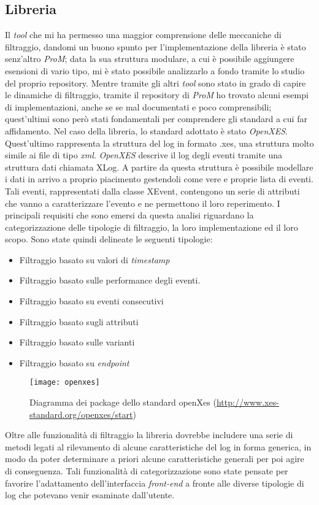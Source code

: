 \subsection{Libreria}
 Il \textit{tool} che mi ha permesso una maggior comprensione delle meccaniche di filtraggio, dandomi un buono spunto per l'implementazione della libreria è stato senz'altro \textit{ProM}; data la sua struttura modulare, a cui è possibile aggiungere esensioni di vario tipo, mi è stato possibile analizzarlo a fondo tramite lo studio del proprio repository. Mentre tramite gli altri \textit{tool} sono stato in grado di capire le dinamiche di filtraggio, tramite il repository di \textit{ProM} ho trovato alcuni esempi di implementazioni, anche se se mal documentati e poco comprensibili; quest'ultimi sono però stati fondamentali per comprendere gli standard a cui far affidamento. Nel caso della libreria, lo standard adottato è stato \textit{OpenXES}. Quest'ultimo rappresenta la struttura del log in formato .xes, una struttura molto simile ai file di tipo \textit{xml}. \textit{OpenXES} descrive il log degli eventi tramite una struttura dati chiamata XLog. A partire da questa struttura è possibile modellare i dati in arrivo a proprio piacimento gestendoli come vere e proprie lista di eventi. Tali eventi, rappresentati dalla classe XEvent, contengono un serie di attributi che vanno a caratterizzare l'evento e ne permettono il loro reperimento. I principali requisiti che sono emersi da questa analisi riguardano la categorizzazione delle tipologie di filtraggio, la loro implementazione ed il loro scopo. Sono state quindi delineate le seguenti tipologie:
\begin{itemize}
	\item Filtraggio basato su valori di \textit{timestamp}
	\item Filtraggio basato sulle performance degli eventi.
	\item Filtraggio basato su eventi consecutivi
	\item Filtraggio basato sugli attributi
	\item Filtraggio basato sulle varianti
	\item Filtraggio basato su \textit{endpoint}
\end{itemize}
\begin{figure}[!h] 
	\centering 
	\texttt{[image: openxes]} 
	\caption{Diagramma dei package dello standard openXes (\url{http://www.xes-standard.org/openxes/start})}
\end{figure}
Oltre alle funzionalità di filtraggio la libreria dovrebbe includere una serie di metodi legati al rilevamento di alcune caratteristiche del log in forma generica, in modo da poter determinare a priori alcune caratteristiche generali per poi agire di conseguenza.
Tali funzionalità di categorizzazione sono state pensate per favorire l'adattamento dell'interfaccia \textit{front-end} a fronte alle diverse tipologie di log che potevano venir esaminate dall'utente.
